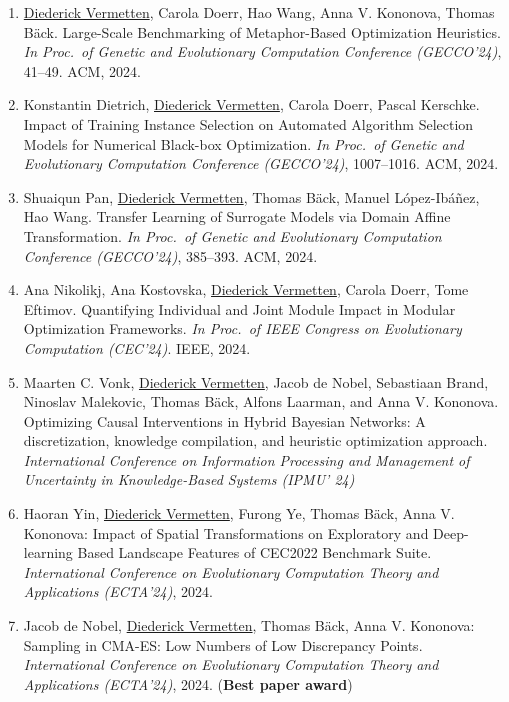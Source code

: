 \begin{enumerate}
    \item \underline{Diederick Vermetten}, Carola Doerr, Hao Wang, Anna V. Kononova, Thomas B\"ack. Large-Scale Benchmarking of Metaphor-Based Optimization Heuristics. 
    \emph{In Proc.~of Genetic and Evolutionary Computation Conference (GECCO'24)}, 41–49. ACM, 2024.
    
    \item Konstantin Dietrich, \underline{Diederick Vermetten}, Carola Doerr, Pascal Kerschke. Impact of Training Instance Selection on Automated Algorithm Selection Models for Numerical Black-box Optimization.
    \emph{In Proc.~of Genetic and Evolutionary Computation Conference (GECCO'24)}, 1007–1016. ACM, 2024.
    
    \item Shuaiqun Pan, \underline{Diederick Vermetten}, Thomas B\"ack, Manuel López-Ibáñez, Hao Wang. Transfer Learning of Surrogate Models via Domain Affine Transformation.
    \emph{In Proc.~of Genetic and Evolutionary Computation Conference (GECCO'24)}, 385–393. ACM, 2024.

    \item Ana Nikolikj, Ana Kostovska, \underline{Diederick Vermetten}, Carola Doerr, Tome Eftimov. Quantifying Individual and Joint Module Impact in Modular Optimization Frameworks.
    \emph{In Proc.~of  IEEE Congress on Evolutionary Computation (CEC'24)}. IEEE, 2024.

    \item Maarten C. Vonk, \underline{Diederick Vermetten}, Jacob de Nobel, Sebastiaan Brand, Ninoslav Malekovic, Thomas Bäck, Alfons Laarman, and Anna V. Kononova. Optimizing Causal Interventions in Hybrid Bayesian Networks: A discretization, knowledge compilation, and heuristic optimization approach. 
    \emph{International Conference on Information Processing and Management of Uncertainty in Knowledge-Based Systems (IPMU' 24)}

    \item Haoran Yin, \underline{Diederick Vermetten}, Furong Ye, Thomas Bäck, Anna V. Kononova: Impact of Spatial Transformations on Exploratory and Deep-learning Based Landscape Features of CEC2022 Benchmark Suite.
    \emph{International Conference on Evolutionary Computation Theory and Applications (ECTA'24)}, 2024.

    \item Jacob de Nobel, \underline{Diederick Vermetten}, Thomas Bäck, Anna V. Kononova: Sampling in CMA-ES: Low Numbers of Low Discrepancy Points.
    \emph{International Conference on Evolutionary Computation Theory and Applications (ECTA'24)}, 2024. (\textbf{Best paper award})
    

\end{enumerate}
